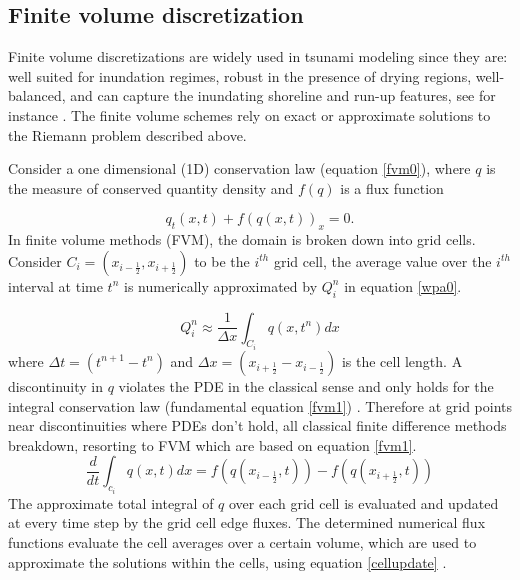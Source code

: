 \documentclass[10pt,a4paper]{article}
\newcommand{\ignore}[1]{}
\begin{document}
	\subsection{Finite volume discretization}
Finite volume discretizations are widely used in tsunami modeling since they are: well suited for inundation regimes, robust in the presence of drying regions, well-balanced, and can capture the inundating shoreline and run-up features, see for instance \citet{ge:2008,ge:2011,george2006finite,be-ge-le-ma:2011,bi2014finite,leveque2002finite,ba-le-mi-ro:2003}. The finite volume schemes rely on exact or approximate solutions to the Riemann problem described above.  

Consider a one dimensional (1D) conservation law  (equation \eqref{fvm0}),  where $q$ is the measure of conserved quantity density and $f(q)$ is a flux function

	\begin{equation}
		q_{t}(x,t) + f(q(x,t))_{x} = 0.
		\label{fvm0}
	\end{equation}	
	In finite volume methods (FVM), the domain is broken down into grid cells. Consider $C_{i} = (x_{i-\frac{1}{2}},x_{i+\frac{1}{2}})$ to be the $i^{th}$ grid cell, the average value over the $i^{th}$ interval at time $t^{n}$ is numerically approximated by $Q_{i}^{n}$ in equation \eqref{wpa0}.
	
	\begin{equation}
		Q_{i}^{n} \approx \dfrac{1}{\Delta x} \int_{C_{i}}q(x,t^{n})dx
		\label{wpa0}
	\end{equation}
	where $\Delta t = (t^{n+1} - t^{n})$ and  $\Delta x = (x_{i+\frac{1}{2}} - x_{i-\frac{1}{2}})$ is the cell length. A discontinuity in $q$ violates the PDE in the classical sense and only holds for the integral conservation law (fundamental equation \eqref{fvm1}) \ignore{\cite{leveque2002finite}}. Therefore at grid points near discontinuities where PDEs don't hold, all classical finite difference methods breakdown, resorting to FVM which are based on equation \eqref{fvm1}. 	
	\begin{equation}
		\frac{d}{dt} \int_{c_{i}} q(x,t)dx = f(q(x_{i-\frac{1}{2}},t)) -  f(q(x_{i+\frac{1}{2}},t))
		\label{fvm1}
	\end{equation}	
	The approximate  total integral of $q$ over each grid cell is evaluated and updated at every time step by the grid cell edge fluxes. The determined numerical flux functions evaluate the  cell averages over a certain volume, which are used to approximate the solutions within the cells, using equation \eqref{cellupdate} \ignore{\cite{le-ge-be:2011}}.
	
\end{document}
